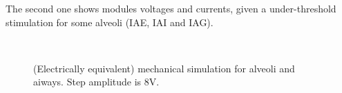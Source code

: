 The second one shows modules voltages and currents, given a
under-threshold stimulation for some alveoli (IAE, IAI and IAG).

\begin{figure}[H]\centering
    \\
    
  \caption{(Electrically equivalent) mechanical simulation for alveoli
    and aiways.  Step amplitude is 8V.}
  \label{fig:mechanical_results_below}
\end{figure}


